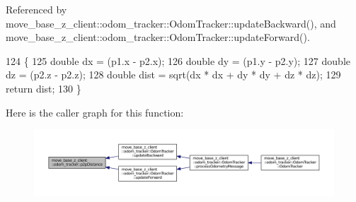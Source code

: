 Referenced by move\+\_\+base\+\_\+z\+\_\+client\+::odom\+\_\+tracker\+::\+Odom\+Tracker\+::update\+Backward(), and move\+\_\+base\+\_\+z\+\_\+client\+::odom\+\_\+tracker\+::\+Odom\+Tracker\+::update\+Forward().


\begin{DoxyCode}
124 \{
125     \textcolor{keywordtype}{double} dx = (p1.x - p2.x);
126     \textcolor{keywordtype}{double} dy = (p1.y - p2.y);
127     \textcolor{keywordtype}{double} dz = (p2.z - p2.z);
128     \textcolor{keywordtype}{double} dist = sqrt(dx * dx + dy * dy + dz * dz);
129     \textcolor{keywordflow}{return} dist;
130 \}
\end{DoxyCode}


Here is the caller graph for this function\+:
\nopagebreak
\begin{figure}[H]
\begin{center}
\leavevmode
\includegraphics[width=350pt]{namespacemove__base__z__client_1_1odom__tracker_a4437fd4b6bf9ca87f5b806ad408fb430_icgraph}
\end{center}
\end{figure}


